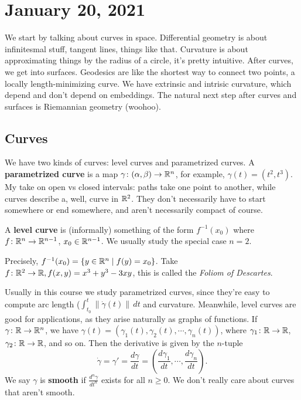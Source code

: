 \section{January 20, 2021}
We start by talking about curves in space. Differential geometry is about infinitesmal stuff, tangent lines, things like that. Curvature is about approximating things by the radius of a circle, it's pretty intuitive. After curves, we get into surfaces. Geodesics are like the shortest way to connect two points, a locally length-minimizing curve. We have extrinsic and intrisic curvature, which depend and don't depend on embeddings. The natural next step after curves and surfaces is Riemannian geometry (woohoo).

\subsection{Curves}
We have two kinds of curves: level curves and parametrized curves. A \textbf{parametrized curve} is a map $\gamma \colon (\alpha ,\beta ) \to \mathbb{R}^n $, for example, $\gamma(t)=(t^2,t^3)$. My take on open vs closed intervals: paths take one point to another, while curves describe a, well, curve in $\mathbb{R}^2$. They don't necessarily have to start somewhere or end somewhere, and aren't necessarily compact of course.

A \textbf{level curve} is (informally) something of the form $f ^{-1}(x_0)$ where $f \colon \mathbb{R}^n  \to \mathbb{R}^{n-1}$, $x_0 \in \mathbb{R}^{n-1}$. We usually study the special case $n=2$.
\begin{example}
    Precisely, $f^{-1}(x_0)= \{y \in \mathbb{R}^n  \mid f(y)=x_0\} $. Take $f \colon \mathbb{R}^2 \to \mathbb{R}, f (x,y)=x^3+y^3-3xy$, this is called the \emph{Foliom of Descartes}.
\end{example}
Usually in this course we study parametrized curves, since they're easy to compute arc length ($\int_{t_0}^{t}  \|\dot\gamma(t)\|\, dt$ and curvature. Meanwhile, level curves are good for applications, as they arise naturally as graphs of functions. If $\gamma \colon \mathbb{R} \to \mathbb{R}^n $, we have $\gamma(t)= (\gamma_1(t), \gamma_2(t),\cdots , \gamma _n (t))  $, where $\gamma_1 \colon \mathbb{R} \to \mathbb{R} $, $\gamma_2 \colon \mathbb{R} \to \mathbb{R} $, and so on. Then the derivative is given by the $n$-tuple \[
    \dot\gamma =\gamma '= \frac{d\gamma }{dt}=\left( \frac{d\gamma_1 }{dt},\cdots ,\frac{d\gamma _n }{dt} \right).
\] We say $\gamma $ is \textbf{smooth} if $\frac{d^n \gamma }{dt ^n }$ exists for all $n\geq 0$. We don't really care about curves that aren't smooth.

